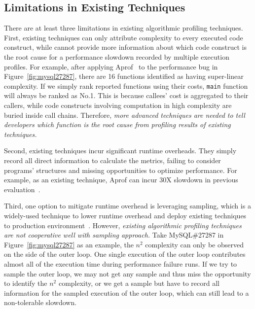 \subsection{Limitations in Existing Techniques}
\label{subsec:existing}


%
There are at least three limitations in existing algorithmic profiling techniques. 
%
First, existing techniques can only 
attribute complexity to every executed code construct, 
while cannot provide more information about 
which code construct is the root cause 
for a performance slowdown recorded by multiple 
execution profiles. 
For example, after applying Aprof~\cite{Aprof1,Aprof2} 
to the performance bug in Figure~\ref{fig:mysql27287}, 
there are 16 functions identified 
as having super-linear complexity. 
If we simply rank reported functions using their costs, 
\texttt{main} function will always be ranked as No.1. 
This is because callees' cost is aggregated to their callers, 
while code constructs involving computation in high complexity 
are buried inside call chains.
Therefore, \emph{
more advanced techniques are needed to tell developers 
which function is the root cause from profiling results of existing techniques. 
}


Second, existing techniques incur significant runtime overheads. 
They simply record all direct information to calculate the metrics, 
failing to consider programs' structures and missing opportunities 
to optimize performance.
For example, as an existing technique, Aprof can incur 
30X slowdown in previous evaluation~\cite{Aprof1,Aprof2}. 




Third, one option to mitigate runtime overhead is leveraging
sampling, which is a widely-used technique to lower runtime overhead 
and deploy existing techniques to production 
environment~\cite{SongOOPSLA2014,liblit03,liblit05,CCI}. 
However, \emph{existing algorithmic profiling techniques are not cooperative well with
sampling approach.} 
Take MySQL\#27287 in Figure~\ref{fig:mysql27287} as an example,
the $n^2$ complexity can only be observed on the side of the outer loop. 
One single execution of the outer loop contributes almost all of 
the execution time during performance failure runs. 
If we try to sample the outer loop, 
we may not get any sample and thus miss the opportunity to 
identify the $n^2$ complexity, or we get a sample but have to 
record all 
information for the sampled execution of the outer loop, 
which can still  lead to a non-tolerable slowdown. 



